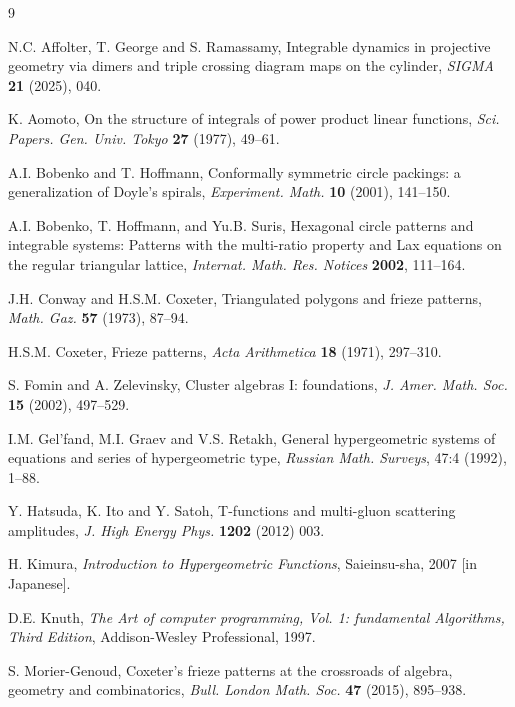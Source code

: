 \documentclass[11pt]{amsart}
\theoremstyle{plain}
\theoremstyle{definition}
\theoremstyle{remark}
\begin{document}
\begin{thebibliography}{9}

N.C. Affolter, T. George and S. Ramassamy,
Integrable dynamics in projective geometry via dimers and triple crossing
diagram maps on the cylinder,
\textit{SIGMA} \textbf{21} (2025), 040.

K. Aomoto, On the structure of integrals
of power product linear functions,
\textit{Sci. Papers. Gen. Univ. Tokyo} \textbf{27} (1977), 49--61.


A.I. Bobenko and T. Hoffmann,
Conformally symmetric circle packings: a generalization of Doyle's spirals,
\emph{Experiment. Math.} \textbf{10} (2001), 141--150.


A.I. Bobenko, T. Hoffmann, and Yu.B. Suris, Hexagonal circle patterns and
integrable systems: Patterns with the multi-ratio property and Lax equations on
the regular triangular lattice, \textit{Internat. Math. Res. Notices}
\textbf{2002}, 111--164.

J.H. Conway and H.S.M. Coxeter, Triangulated polygons and frieze patterns,
\emph{Math. Gaz.} \textbf{57} (1973), 87--94.

H.S.M. Coxeter, Frieze patterns, \emph{Acta Arithmetica} \textbf{18} (1971),
297--310.

S. Fomin and A. Zelevinsky, Cluster algebras I: foundations, \emph{J. Amer.
Math. Soc.} \textbf{15} (2002), 497--529.

I.M. Gel'fand, M.I. Graev and V.S. Retakh,
General hypergeometric systems of equations and series of hypergeometric type,
\textit{Russian Math. Surveys}, 47:4 (1992), 1--88.

Y. Hatsuda, K. Ito and Y. Satoh,
T-functions and multi-gluon scattering amplitudes,
\textit{J. High Energy Phys.} \textbf{1202} (2012) 003.

H. Kimura, 
\textit{Introduction to Hypergeometric Functions}, 
Saieinsu-sha, 2007 [in Japanese]. 

D.E. Knuth,
\textit{The Art of computer programming, Vol. 1: fundamental Algorithms, Third
Edition}, Addison-Wesley Professional, 1997.

S. Morier-Genoud,
Coxeter’s frieze patterns at the crossroads of algebra, geometry and
combinatorics, \textit{Bull. London Math. Soc.} \textbf{47} (2015), 895--938.


\end{thebibliography}
\end{document}
